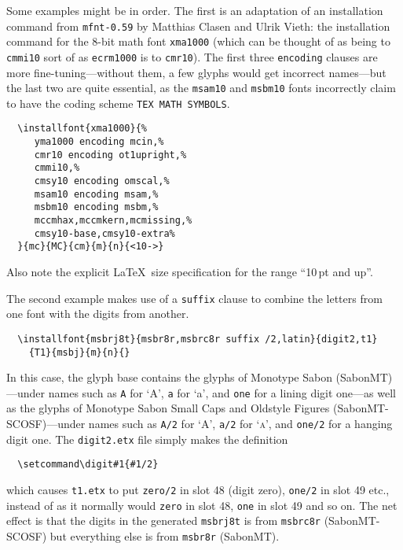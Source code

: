 \documentclass[a4paper]{ltxguide}
\begin{document}
Some examples might be in order. The first is an adaptation of an 
installation command from \texttt{mfnt-0.59} %
by Matthias Clasen and Ulrik Vieth: the installation command for the 
8-bit math font \texttt{xma1000} (which can be thought of as being 
to \texttt{cmmi10} sort of as \texttt{ecrm1000} is to \texttt{cmr10}). 
The first three \texttt{encoding} clauses are more fine-tuning---without 
them, a few glyphs would get incorrect names---but the last two are 
quite essential, as the \texttt{msam10} and \texttt{msbm10} fonts 
incorrectly claim to have the coding scheme \texttt{TEX MATH 
SYMBOLS}.
\begin{verbatim}
  \installfont{xma1000}{%
     yma1000 encoding mcin,%
     cmr10 encoding ot1upright,%
     cmmi10,%
     cmsy10 encoding omscal,%
     msam10 encoding msam,%
     msbm10 encoding msbm,%
     mccmhax,mccmkern,mcmissing,%
     cmsy10-base,cmsy10-extra%
  }{mc}{MC}{cm}{m}{n}{<10->}
\end{verbatim}
Also note the explicit \LaTeX\ size specification for the range 
``10\,pt and up''.

The second example makes use of a \texttt{suffix} clause to combine 
the letters from one font with the digits from another.
\begin{verbatim}
  \installfont{msbrj8t}{msbr8r,msbrc8r suffix /2,latin}{digit2,t1}
    {T1}{msbj}{m}{n}{}
\end{verbatim}
In this case, the glyph base contains the glyphs of Monotype Sabon 
(SabonMT)---under names such as \texttt{A} for `A', \texttt{a} for 
`a', and \texttt{one} for a lining digit one---as well as the 
glyphs of Monotype Sabon Small Caps and Oldstyle Figures 
(SabonMT-SCOSF)---under names such as \texttt{A/2} for `A', 
\texttt{a/2} for `\textsc{a}', and \texttt{one/2} for a hanging 
digit one. The \texttt{digit2.etx} file simply makes the definition
\begin{verbatim}
  \setcommand\digit#1{#1/2}
\end{verbatim}
which causes \texttt{t1.etx} to put \texttt{zero/2} in slot 48 (digit 
zero), \texttt{one/2} in slot 49 etc., instead of as it normally 
would \texttt{zero} in slot 48, \texttt{one} in slot 49 and so on. 
The net effect is that the digits in the generated \texttt{msbrj8t} 
is from \texttt{msbrc8r} (SabonMT-SCOSF) but everything else is from 
\texttt{msbr8r} (SabonMT).
\end{document}
